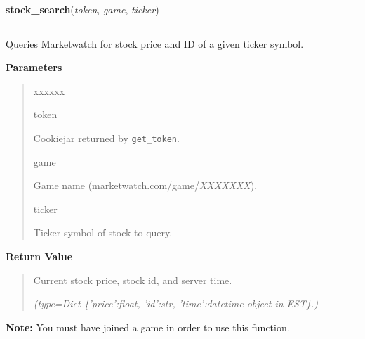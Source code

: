     \label{moira:stock_search}

    \vspace{0.5ex}

\hspace{.8\funcindent}\begin{boxedminipage}{\funcwidth}

    \raggedright \textbf{stock\_search}(\textit{token}, \textit{game}, \textit{ticker})

    \vspace{-1.5ex}

    \rule{\textwidth}{0.5\fboxrule}
\setlength{\parskip}{2ex}
    Queries Marketwatch for stock price and ID of a given ticker symbol.

\setlength{\parskip}{1ex}
      \textbf{Parameters}
      \vspace{-1ex}

      \begin{quote}
        \begin{Ventry}{xxxxxx}

          \item[token]

          Cookiejar returned by \texttt{get\_token}.

          \item[game]

          Game name (marketwatch.com/game/\textit{XXXXXXX}).

          \item[ticker]

          Ticker symbol of stock to query.

        \end{Ventry}

      \end{quote}

      \textbf{Return Value}
    \vspace{-1ex}

      \begin{quote}
      Current stock price, stock id, and server time.

      {\it (type=Dict \{'price':float, 'id':str, 'time':\textit{datetime} object in 
      EST\}.)}

      \end{quote}

\textbf{Note:} You must have joined a game in order to use this function.



    \end{boxedminipage}


